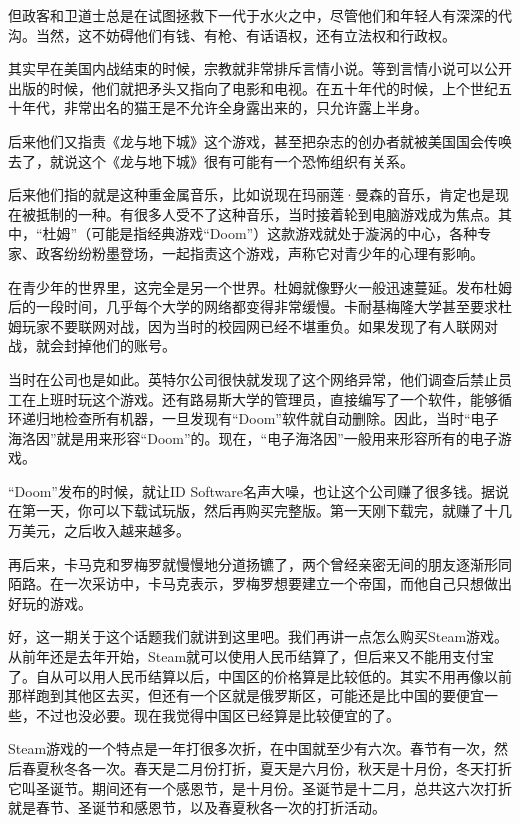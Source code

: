 \documentclass[
  letterpaper,
  DIV=11,
  numbers=noendperiod]{scrreprt}
\begin{document}
但政客和卫道士总是在试图拯救下一代于水火之中，尽管他们和年轻人有深深的代沟。当然，这不妨碍他们有钱、有枪、有话语权，还有立法权和行政权。

其实早在美国内战结束的时候，宗教就非常排斥言情小说。等到言情小说可以公开出版的时候，他们就把矛头又指向了电影和电视。在五十年代的时候，上个世纪五十年代，非常出名的猫王是不允许全身露出来的，只允许露上半身。

后来他们又指责《龙与地下城》这个游戏，甚至把杂志的创办者就被美国国会传唤去了，就说这个《龙与地下城》很有可能有一个恐怖组织有关系。

后来他们指的就是这种重金属音乐，比如说现在玛丽莲·曼森的音乐，肯定也是现在被抵制的一种。有很多人受不了这种音乐，当时接着轮到电脑游戏成为焦点。其中，``杜姆''（可能是指经典游戏``Doom''）这款游戏就处于漩涡的中心，各种专家、政客纷纷粉墨登场，一起指责这个游戏，声称它对青少年的心理有影响。

在青少年的世界里，这完全是另一个世界。杜姆就像野火一般迅速蔓延。发布杜姆后的一段时间，几乎每个大学的网络都变得非常缓慢。卡耐基梅隆大学甚至要求杜姆玩家不要联网对战，因为当时的校园网已经不堪重负。如果发现了有人联网对战，就会封掉他们的账号。

当时在公司也是如此。英特尔公司很快就发现了这个网络异常，他们调查后禁止员工在上班时玩这个游戏。还有路易斯大学的管理员，直接编写了一个软件，能够循环递归地检查所有机器，一旦发现有``Doom''软件就自动删除。因此，当时``电子海洛因''就是用来形容``Doom''的。现在，``电子海洛因''一般用来形容所有的电子游戏。

``Doom''发布的时候，就让ID
Software名声大噪，也让这个公司赚了很多钱。据说在第一天，你可以下载试玩版，然后再购买完整版。第一天刚下载完，就赚了十几万美元，之后收入越来越多。

再后来，卡马克和罗梅罗就慢慢地分道扬镳了，两个曾经亲密无间的朋友逐渐形同陌路。在一次采访中，卡马克表示，罗梅罗想要建立一个帝国，而他自己只想做出好玩的游戏。

好，这一期关于这个话题我们就讲到这里吧。我们再讲一点怎么购买Steam游戏。从前年还是去年开始，Steam就可以使用人民币结算了，但后来又不能用支付宝了。自从可以用人民币结算以后，中国区的价格算是比较低的。其实不用再像以前那样跑到其他区去买，但还有一个区就是俄罗斯区，可能还是比中国的要便宜一些，不过也没必要。现在我觉得中国区已经算是比较便宜的了。

Steam游戏的一个特点是一年打很多次折，在中国就至少有六次。春节有一次，然后春夏秋冬各一次。春天是二月份打折，夏天是六月份，秋天是十月份，冬天打折它叫圣诞节。期间还有一个感恩节，是十月份。圣诞节是十二月，总共这六次打折就是春节、圣诞节和感恩节，以及春夏秋各一次的打折活动。
\end{document}
